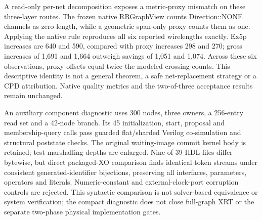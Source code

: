 \documentclass[10pt]{article}
\begin{document}
A read-only per-net decomposition exposes a metric-proxy mismatch on
these three-layer routes. The frozen native RRGraphView counts
Direction::NONE channels as zero length, while a geometric span-only
proxy counts them as one. Applying the native rule reproduces all six
reported wirelengths exactly. Ex5p increases are 640 and 590, compared
with proxy increases 298 and 270; gross increases of 1,691 and 1,664
outweigh savings of 1,051 and 1,074. Across these six observations,
proxy offsets equal twice the modeled crossing counts. This descriptive
identity is not a general theorem, a safe net-replacement strategy or a
CPD attribution. Native quality metrics and the two-of-three acceptance
results remain unchanged.

An auxiliary component diagnostic uses 300 nodes, three owners, a
256-entry read set and a 42-node branch. Its 45 initialization, start,
proposal and membership-query calls pass guarded flat/sharded Verilog
co-simulation and structural poststate checks. The original waiting-image
commit kernel body is retained; test-marshalling depths are enlarged.
Nine of 39 HDL files differ bytewise, but direct packaged-XO comparison
finds identical token streams under consistent generated-identifier
bijections, preserving all interfaces, parameters, operators and literals.
Numeric-constant and external-clock-port corruption controls are rejected.
This syntactic comparison is not solver-based equivalence or system
verification; the compact diagnostic does not close full-graph XRT or
the separate two-phase physical implementation gates.
\end{document}
